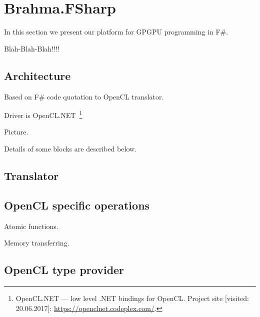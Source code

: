 \section{Brahma.FSharp}

In this section we present our platform for GPGPU programming in F\#.

Blah-Blah-Blah!!!!

\subsection{Architecture}

Based on F\# code quotation to OpenCL translator.

Driver is OpenCL.NET~\footnote{OpenCL.NET --- low level .NET bindings for OpenCL. Project site [visited: 20.06.2017]: \url{https://openclnet.codeplex.com/}.}

Picture.

Details of some blocks are described below.


\subsection{Translator}

\subsection{OpenCL specific operations}

Atomic functions.

Memory transferring.

\subsection{OpenCL type provider}